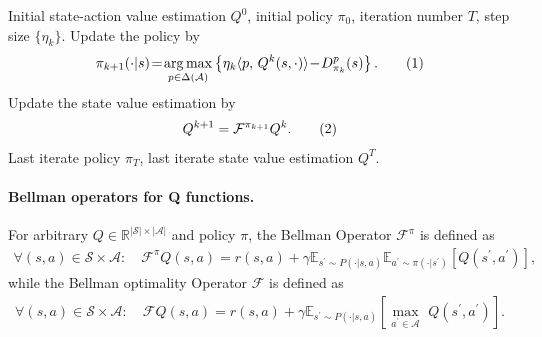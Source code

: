 \documentclass[10pt]{article}
\newcommand{\calA}{\mathcal{A}}
\newcommand{\ls}{\left}
\newcommand{\rs}{\right}
\newcommand\numberthis{\addtocounter{equation}{1}\tag{\theequation}}
\theoremstyle{plain}
\theoremstyle{definition}
\begin{document}
\begin{algorithm}[ht!]
   \caption{Q-TD-PMD}
   \label{alg:Q-TD-PMD}
\begin{algorithmic}
    {
    Initial state-action value estimation $Q^0$, initial policy $\pi_0$, iteration number $T$, step size $\{ \eta_k \}$.
   \vspace{0.2cm}
    Update the policy by
   \begin{align*}
       \pi_{k+1}(\cdot|s) \!=\! \underset{p\in\Delta(\calA)}{\arg\max} \ls\{ \eta_k \langle p, \, Q^{k}(s,\cdot) \rangle \!-\! D^p_{\pi_k}(s) \rs\}.\numberthis\label{eq:alg2pi}
   \end{align*}
    Update the state value estimation by
   \begin{align*}
       Q^{k+1} = \mathcal{F}^{\pi_{k+1}} Q^k.\numberthis\label{eq:alg2Q}
   \end{align*}
   \ENDFOR
    Last iterate policy $\pi_T$, last iterate state value estimation $Q^T$.
   }
\end{algorithmic}
\end{algorithm}

\paragraph{Bellman operators for Q functions.}  For arbitrary $Q\in \mathbb{R}^{\left|\mathcal{S}\right|\times\left|\mathcal{A}\right|}$ and policy $\pi$,  the Bellman Operator $\mathcal{F}^\pi$ is defined as 
    \begin{align*}
    \forall(s,a)\in \mathcal{S}\times \mathcal{A}:\quad \mathcal{F} ^{\pi}Q\left( s,a \right) =r\left( s,a \right) +\gamma \mathbb{E} _{s^{\prime}\sim P\left( \cdot |s,a \right)}\mathbb{E} _{a^\prime\sim \pi \left( \cdot |s^{\prime} \right)}\left[ Q\left( s^{\prime},a^{\prime} \right) \right], 
\end{align*}
while the Bellman optimality Operator $\mathcal{F}$ is defined as 
    \begin{align*}
\forall (s,a)\in \mathcal{S} \times \mathcal{A} : \quad \mathcal{F} Q\left( s,a \right) =r\left( s,a \right) +\gamma \mathbb{E} _{s^{\prime}\sim P\left( \cdot |s,a \right)}\left[ \underset{a^{\prime}\in \mathcal{A}}{\max}\,\,Q\left( s^{\prime},a^{\prime} \right) \right].
\end{align*}

    
\end{document}
